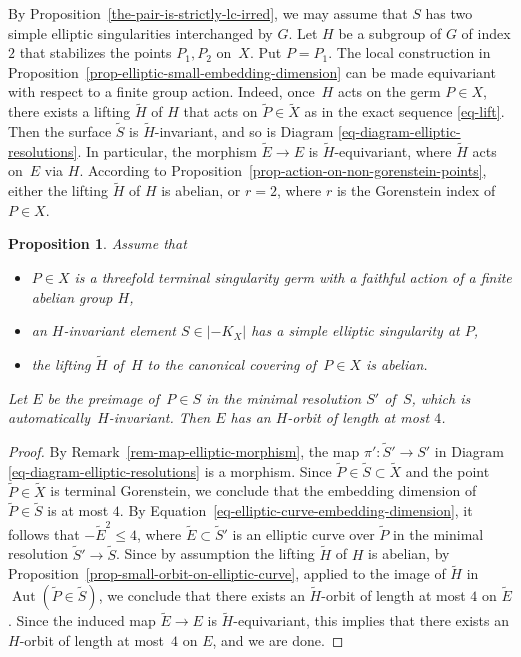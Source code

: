 \documentclass[11pt]{amsart}
\numberwithin{equation}{section}
\newtheorem{proposition}[thm]{Proposition}
\theoremstyle{definition}
\theoremstyle{remark}
\DeclareMathOperator{\Aut}{Aut}
\begin{document}
By Proposition~\ref{the-pair-is-strictly-lc-irred}, we may assume that $S$ has two simple elliptic singularities interchanged by $G$.  Let $H$ be a subgroup of $G$ of index $2$ that stabilizes the points $P_1, P_2$ on~$X$. Put $P=P_1$. The local construction in Proposition~\ref{prop-elliptic-small-embedding-dimension} can be made equivariant with respect to a finite group action. Indeed, once~$H$ acts on the germ $P\in X$, there exists a lifting $\widetilde{H}$ of $H$ that acts on $\widetilde{P}\in \widetilde{X}$ as in the exact sequence \eqref{eq-lift}.  Then the surface $\widetilde{S}$ is $\widetilde{H}$-invariant, and so is Diagram \eqref{eq-diagram-elliptic-resolutions}.  In particular, the morphism $\widetilde{E}\to E$ is $\widetilde{H}$-equivariant, where $\widetilde{H}$ acts on~$E$ via $H$.  According to Proposition~\ref{prop-action-on-non-gorenstein-points}, either the lifting $\widetilde{H}$ of $H$ is abelian, or $r=2$, where $r$ is the Gorenstein index of $P\in X$.

\begin{proposition}
\label{prop-elliptic-sing-short-orbit}
Assume that 
\begin{itemize}
\item
$P\in X$ is a threefold terminal singularity germ with a faithful action of a finite abelian group $H$,
\item
an $H$-invariant element $S\in |-K_X|$ has a simple elliptic singularity at $P$,
\item
the lifting $\widetilde{H}$ of\, $H$ to the canonical covering of\, $P\in X$ is abelian.
\end{itemize}
Let $E$ be the preimage of\, $P\in S$ in the minimal resolution $S'$ of\, $S$, which is automatically~$H$-invariant. 
Then $E$ has an $H$-orbit of length at most $4$. 
\end{proposition}

\begin{proof}
By Remark~\ref{rem-map-elliptic-morphism}, the map $\pi'\colon \widetilde{S}'\to S'$ in Diagram \eqref{eq-diagram-elliptic-resolutions} is a morphism. Since $\widetilde{P}\in \widetilde{S}\subset \widetilde{X}$ and the point $\widetilde{P}\in \widetilde{X}$ is terminal Gorenstein, 
we conclude that the embedding dimension of $\widetilde{P}\in \widetilde{S}$ is at most $4$. By Equation~\eqref{eq-elliptic-curve-embedding-dimension}, it follows that $-\widetilde{E}^2\leq 4$, where $\widetilde{E}\subset \widetilde{S}'$ is an elliptic curve over $\widetilde{P}$ in the minimal resolution $\widetilde{S}'\to \widetilde{S}$. Since by assumption the lifting $\widetilde{H}$ of $H$ is abelian, by Proposition~\ref{prop-small-orbit-on-elliptic-curve}, applied to the image of $\widetilde H$ in $\Aut(\widetilde P\in\widetilde S)$, we conclude that there exists an $\widetilde{H}$-orbit of length at most $4$ on $\widetilde{E}$. Since the induced map $\widetilde{E}\to E$ is $\widetilde{H}$-equivariant, this implies that there exists an $H$-orbit of length at most~$4$ on $E$, and we are done.
\end{proof}
\end{document}
